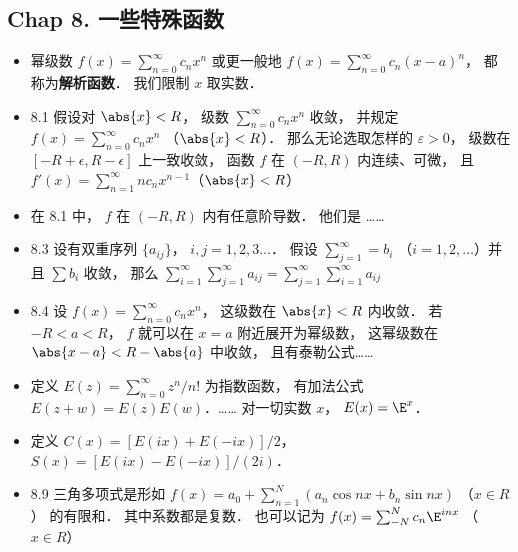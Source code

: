 \subsection{Chap 8. 一些特殊函数}

\begin{itemize}
\item 幂级数 $f(x) = \sum_{n=0}^\infty c_n x^n$ 或更一般地 $f(x) = \sum_{n=0}^\infty c_n (x-a)^n$， 都称为\textbf{解析函数}． 我们限制 $x$ 取实数．

\item 8.1 假设对 $\abs{x}<R$， 级数 $\sum_{n=0}^\infty c_n x^n$ 收敛， 并规定 $f(x) = \sum_{n=0}^\infty c_n x^n$ （$\abs{x}<R$）． 那么无论选取怎样的 $\varepsilon >0$， 级数在 $[-R+\epsilon, R-\epsilon]$ 上一致收敛， 函数 $f$ 在 $(-R,R)$ 内连续、可微， 且 $f'(x)=\sum_{n=1}^\infty nc_n x^{n-1}$（$\abs{x}<R$）

\item 在 8.1 中， $f$ 在 $(-R,R)$ 内有任意阶导数． 他们是 ……

\item 8.3 设有双重序列 $\{a_{ij}\}$， $i,j=1,2,3\dots$． 假设 $\sum_{j=1}^\infty = b_i$ （$i=1,2,\dots$）并且 $\sum b_i$ 收敛， 那么 $\sum_{i=1}^\infty\sum_{j=1}^\infty a_{ij} = \sum_{j=1}^\infty\sum_{i=1}^\infty a_{ij}$

\item 8.4 设 $f(x)=\sum_{n=0}^\infty c_nx^n$， 这级数在 $\abs{x}<R$ 内收敛． 若 $-R<a<R$， $f$ 就可以在 $x=a$ 附近展开为幂级数， 这幂级数在 $\abs{x-a}<R-\abs{a}$ 中收敛， 且有泰勒公式……

\item 定义 $E(z) = \sum_{n=0}^\infty z^n/n!$ 为指数函数， 有加法公式 $E(z+w)=E(z)E(w)$．……  对一切实数 $x$， $E(x)=\E^x$．

\item 定义 $C(x) = [E(ix)+E(-ix)]/2$， $S(x)=[E(ix)-E(-ix)]/(2i)$．

\item 8.9 三角多项式是形如 $f(x) = a_0 + \sum_{n=1}^N (a_n\cos nx + b_n \sin nx)$ （$x\in R$） 的有限和． 其中系数都是复数． 也可以记为 $f(x) = \sum_{-N}^N c_n \E^{inx}$ （$x\in R$）
\end{itemize}

